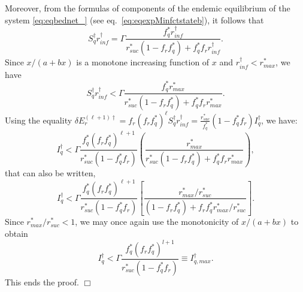 \documentclass[a4paper]{article}
\newcommand{\edem}{\hfill $\Box$ }
\newcommand{\barvarphiVar}{r_{max}}
\newcommand{\varphiVar}{r_{inf}}
\newcommand{\varpiVar}{r_{suc}}
\newcommand{\IqstarmaxVar}{I_{q,max}^{\dagger}}
\begin{document}
\noindent Moreover, from the formulas of components of the endemic  equilibrium of the system \eqref{eq:eqbednet_} (see eq.~\eqref{eq:eqexpMinfctstateb}),  it follows that 
\[S_q^\dagger  \varphiVar ^\dagger  = \Gamma \frac{f_q^*\varphiVar ^\dagger }{ \varpiVar ^*(1 - f_r f_q^*) +  f_q^*f_r \varphiVar^\dagger}. \]
Since $x / (a + bx)$ is a monotone increasing function of $x$ and $\varphiVar ^\dagger  < \barvarphiVar^* $, we have
\[S_q^\dagger  \varphiVar ^\dagger  < \Gamma \frac{f_q^*\barvarphiVar^*}{ \varpiVar ^*(1 - f_r f_q^*) +  f_q^*f_r \barvarphiVar^*}. \]
Using the equality $ \delta E_r^{(\ell+1)\dagger } = f_r (f_r f_q^*)^\ell S_q^\dagger  \varphiVar ^\dagger  = \frac{\varpiVar ^*}{f^*_q }(1-f^*_qf_r) I_q^\dagger $,   we have: 
\[
I_q^\dagger  < \Gamma \frac{f_q^*(f_r f_q^*)^{\ell+1}}{\varpiVar ^*(1 - f_q^*f_r)}  \left( \frac{ \barvarphiVar^*}{\varpiVar ^*(1 - f_r f_q^*) +  f_q^*f_r \barvarphiVar^*} \right),\]
that can also be written,
\[
I_q^\dagger  < \Gamma \frac{ f_q^*(f_r f_q^*)^{\ell+1}}{\varpiVar ^*(1 - f_q^*f_r)}  \left[ \frac{\barvarphiVar^*/\varpiVar ^*}{(1 -f_r f_q^*) +  f_r f_q^*\barvarphiVar^*/\varpiVar ^*  } \right].\]
Since $\barvarphiVar^*/\varpiVar ^* < 1$, we may once again use the monotonicity of $x/(a+bx)$ to obtain
\begin{equation}\label{eq:Iqbar_final}
I_q^\dagger  < \Gamma \frac{ f_q^*(f_r f_q^*)^{l+1}}{\varpiVar ^*(1 - f_q^*f_r)}\equiv \IqstarmaxVar .
\end{equation}
This ends the proof. \edem
\end{document}
